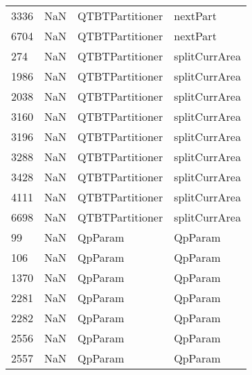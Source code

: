 \begin{tabular}{llll}
3336 &                   NaN &            QTBTPartitioner &                                  nextPart \\
6704 &                   NaN &            QTBTPartitioner &                                  nextPart \\
274  &                   NaN &            QTBTPartitioner &                             splitCurrArea \\
1986 &                   NaN &            QTBTPartitioner &                             splitCurrArea \\
2038 &                   NaN &            QTBTPartitioner &                             splitCurrArea \\
3160 &                   NaN &            QTBTPartitioner &                             splitCurrArea \\
3196 &                   NaN &            QTBTPartitioner &                             splitCurrArea \\
3288 &                   NaN &            QTBTPartitioner &                             splitCurrArea \\
3428 &                   NaN &            QTBTPartitioner &                             splitCurrArea \\
4111 &                   NaN &            QTBTPartitioner &                             splitCurrArea \\
6698 &                   NaN &            QTBTPartitioner &                             splitCurrArea \\
99   &                   NaN &                    QpParam &                                   QpParam \\
106  &                   NaN &                    QpParam &                                   QpParam \\
1370 &                   NaN &                    QpParam &                                   QpParam \\
2281 &                   NaN &                    QpParam &                                   QpParam \\
2282 &                   NaN &                    QpParam &                                   QpParam \\
2556 &                   NaN &                    QpParam &                                   QpParam \\
2557 &                   NaN &                    QpParam &                                   QpParam \\

\end{tabular}
